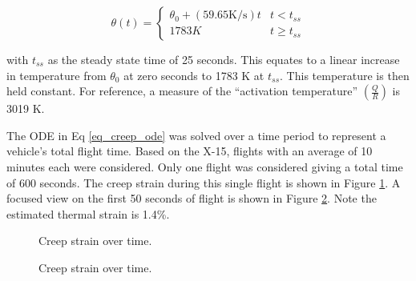 \documentclass[conf]{new-aiaa}
\begin{document}
\begin{equation}
\theta(t) = \begin{cases}
 \theta_0 + (59.65 \text{K/s})t & t < t_{ss} \\
1783 K                          & t\geq t_{ss}
\end{cases}
\end{equation}

\noindent
with $t_{ss}$ as the steady state time of 25 seconds.
This equates to a linear increase in temperature from 
$\theta_0$ at zero seconds to 1783 K at $t_{ss}$.
This temperature is then held constant.
For reference, a measure of the ``activation temperature'' 
$\left(\frac{Q}{R}\right)$ is 3019 K.

The ODE in Eq \ref{eq_creep_ode} was solved over a time period to represent a
vehicle's total flight time.
Based on the X-15, flights with an average of 10 minutes each 
\cite{ kordes_structureal_heating_experiencs_on_the_x15_airplane}
were considered.
Only one flight was considered giving a total time of 600 seconds.
The creep strain during this single flight is shown in Figure
\ref{fig_creep_strain}.
A focused view on the first 50 seconds of flight is shown 
in Figure \ref{fig_focused_creep_strain}.
Note the estimated thermal strain is 1.4\%.

\begin{figure}[H]
  \centering
  \caption{ Creep strain over time.}
  \label{fig_creep_strain}
\end{figure}

\begin{figure}[H]
  \centering
  \caption{ Creep strain over time.}
  \label{fig_focused_creep_strain}
\end{figure}
\end{document}
